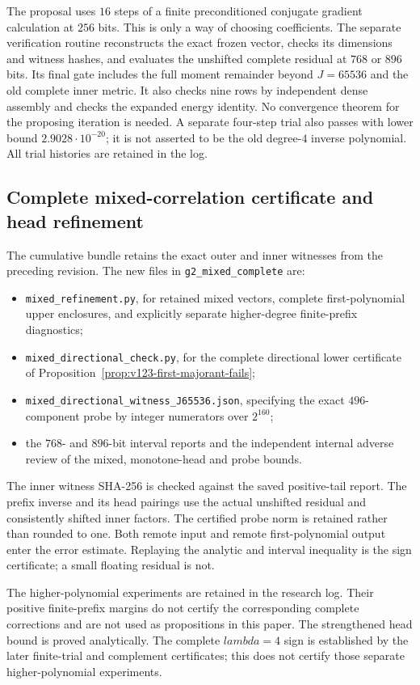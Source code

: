 \documentclass[11pt]{article}
\def\lambda{lambda}%
\theoremstyle{remark}
\begin{document}
The proposal uses $16$ steps of a finite preconditioned conjugate
gradient calculation at $256$ bits. This is only a way of choosing
coefficients. The separate verification routine reconstructs the
exact frozen vector, checks its dimensions and witness hashes,
and evaluates the unshifted complete residual at $768$ or $896$
bits. Its final gate includes the full moment remainder beyond
$J=65536$ and the old complete inner metric. It also checks nine
rows by independent dense assembly and checks the expanded energy
identity. No convergence theorem for the proposing iteration is
needed. A separate four-step trial also passes with lower bound
$2.9028\cdot10^{-20}$; it is not asserted to be the old degree-$4$
inverse polynomial. All trial histories are retained in the log.

\subsection{Complete mixed-correlation certificate and head refinement}
\label{app:v123-mixed}
The cumulative bundle retains the exact outer and inner witnesses
from the preceding revision. The new files in
\texttt{g2\_mixed\_complete} are:
\begin{itemize}[nosep]
\item \nolinkurl{mixed_refinement.py}, for retained mixed vectors,
complete first-polynomial upper enclosures, and explicitly separate
higher-degree finite-prefix diagnostics;
\item \nolinkurl{mixed_directional_check.py}, for the complete
directional lower certificate of
Proposition~\ref{prop:v123-first-majorant-fails};
\item \nolinkurl{mixed_directional_witness_J65536.json}, specifying
the exact $496$-component probe by integer numerators over $2^{160}$;
\item the $768$- and $896$-bit interval reports and the independent
internal adverse review of the mixed, monotone-head and probe bounds.
\end{itemize}
The inner witness SHA-256 is checked against the saved positive-tail
report. The prefix inverse and its head pairings use the actual
unshifted residual and consistently shifted inner factors. The
certified probe norm is retained rather than rounded to one.
Both remote input and remote first-polynomial output enter the
error estimate. Replaying the analytic and interval inequality is
the sign certificate; a small floating residual is not.

The higher-polynomial experiments are retained in the research log.
Their positive finite-prefix margins do not certify the corresponding
complete corrections and are not used as propositions in this paper.
The strengthened head bound is proved analytically. The complete
$\lambda=4$ sign is established by the later finite-trial and
complement certificates; this does not certify those separate
higher-polynomial experiments.
\end{document}
